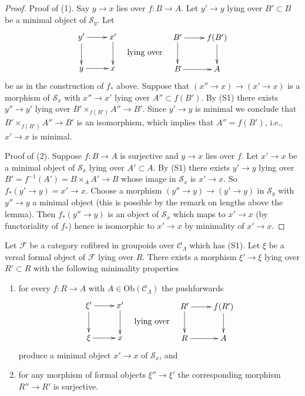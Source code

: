 \begin{proof}
Proof of (1). Say $y \to x$ lies over $f : B \to A$. Let $y' \to y$
lying over $B' \subset B$ be a minimal object of $\mathcal{S}_y$. Let
$$
\vcenter{
\xymatrix{
y' \ar[d] \ar[r] & x' \ar[d] \\
y \ar[r] & x
}
}
\quad\text{lying over}\quad
\vcenter{
\xymatrix{
B' \ar[d] \ar[r] & f(B') \ar[d] \\
B \ar[r] & A
}
}
$$
be as in the construction of $f_*$ above. Suppose that
$(x'' \to x) \to (x' \to x)$ is a morphism of $\mathcal{S}_x$
with $x'' \to x'$ lying over $A'' \subset f(B')$. By (S1)
there exists $y'' \to y'$ lying over $B' \times_{f(B')} A'' \to B'$.
Since $y' \to y$ is minimal we conclude that
$B' \times_{f(B')} A'' \to B'$ is an isomorphism, which implies that
$A'' = f(B')$, i.e., $x' \to x$ is minimal.

\medskip\noindent
Proof of (2). Suppose $f : B \to A$ is surjective and $y \to x$ lies over $f$.
Let $x' \to x$ be a minimal object of $\mathcal{S}_x$ lying over $A' \subset A$.
By (S1) there exists $y' \to y$ lying over
$B' = f^{-1}(A') = B \times_A A' \to B$ whose image in $\mathcal{S}_x$ is
$x' \to x$. So $f_*(y' \to y) = x' \to x$.
Choose a morphism $(y'' \to y) \to (y' \to y)$ in
$\mathcal{S}_y$ with $y'' \to y$ a minimal object (this is possible by
the remark on lengths above the lemma). Then $f_*(y'' \to y)$ is an
object of $\mathcal{S}_x$ which maps to $x' \to x$ (by functoriality of
$f_*$) hence is isomorphic to $x' \to x$ by minimality of $x' \to x$.
\end{proof}

\begin{lemma}
\label{lemma-smallest-where-descends-versal}
Let $\mathcal{F}$ be a category cofibred in groupoids over
$\mathcal{C}_\Lambda$ which has (S1). Let $\xi$ be a versal formal object
of $\mathcal{F}$ lying over $R$. There exists a morphism $\xi' \to \xi$
lying over $R' \subset R$ with the following minimality properties
\begin{enumerate}
\item for every $f : R \to A$ with $A \in \text{Ob}(\mathcal{C}_\Lambda)$
the pushforwards
$$
\vcenter{
\xymatrix{
\xi' \ar[d] \ar[r] & x' \ar[d] \\
\xi \ar[r] & x
}
}
\quad\text{lying over}\quad
\vcenter{
\xymatrix{
R' \ar[d] \ar[r] & f(R') \ar[d] \\
R \ar[r] & A
}
}
$$
produce a minimal object $x' \to x$ of $\mathcal{S}_x$, and
\item for any morphism of formal objects $\xi'' \to \xi'$
the corresponding morphism $R'' \to R'$ is surjective.
\end{enumerate}
\end{lemma}

